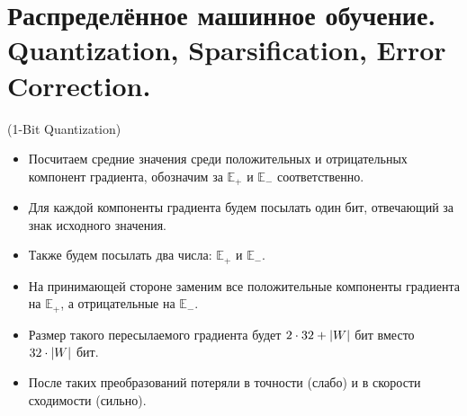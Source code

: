 \section{Распределённое машинное обучение. Quantization, Sparsification,
  Error Correction.}

\begin{algorithm}(1-Bit Quantization)
  \begin{itemize}
    \item Посчитаем средние значения среди положительных и
      отрицательных компонент градиента, обозначим за $\mathbb{E}_+$ и $\mathbb{E}_-$
      соответственно.
    \item Для каждой компоненты градиента будем посылать один бит, отвечающий
      за знак исходного значения.
    \item Также будем посылать два числа: $\mathbb{E}_+$ и $\mathbb{E}_-$.
    \item На принимающей стороне заменим все положительные компоненты градиента на $\mathbb{E}_+$,
      а отрицательные на $\mathbb{E}_-$.
    \item Размер такого пересылаемого градиента будет $2 \cdot 32 + \lvert W\rvert$ бит вместо
      $32 \cdot \lvert W\rvert$ бит.
     \item После таких преобразований потеряли в точности (слабо) и в скорости сходимости (сильно).
  \end{itemize}
\end{algorithm}

